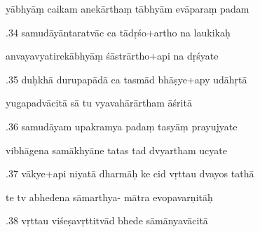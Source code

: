 \documentclass[article,12pt,a4paper]{memoir}%
\newcounter{parCount}
\begin{document}
	  
	  \pstart \leavevmode%
	yābhyāṃ caikam anekārthaṃ tābhyām evāparaṃ padam 
	{}
	\pend%
      

	  
	  \pstart {}.34 samudāyāntaratvāc ca tādṛśo+artho na laukikaḥ 
	{}
	\pend%
      

	  
	  \pstart \leavevmode%
	anvayavyatirekābhyāṃ śāstrārtho+api na dṛśyate 
	{}
	\pend%
      

	  
	  \pstart {}.35 duḥkhā durupapādā ca tasmād bhāṣye+apy udāhṛtā 
	{}
	\pend%
      

	  
	  \pstart \leavevmode%
	yugapadvācitā sā tu vyavahārārtham āśritā 
	{}
	\pend%
      

	  
	  \pstart {}.36 samudāyam upakramya padaṃ tasyāṃ prayujyate 
	{}
	\pend%
      

	  
	  \pstart \leavevmode%
	vibhāgena samākhyāne tatas tad dvyartham ucyate 
	{}
	\pend%
      

	  
	  \pstart {}.37 vākye+api niyatā dharmāḥ ke cid vṛttau dvayos tathā 
	{}
	\pend%
      

	  
	  \pstart \leavevmode%
	te tv abhedena sāmarthya- mātra evopavarṇitāḥ 
	{}
	\pend%
      

	  
	  \pstart {}.38 vṛttau viśeṣavṛttitvād bhede sāmānyavācitā 
	{}
	\pend%
      
\end{document}
